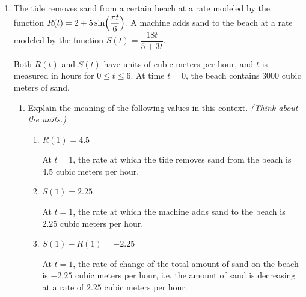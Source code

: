 \documentclass[main]{subfiles}
\begin{document}
\begin{enumerate}
\item The tide removes sand from a certain beach at 
a rate modeled by the function
$R(t)=2+5\sin\Bigl(\dfrac{\pi t}{6}\Bigr).$
A machine adds sand to the beach at a rate modeled by
the function
$S(t)=\dfrac{18t}{5+3t}.$

Both $R(t)$ and $S(t)$ have units of cubic meters per hour, and $t$
is measured in hours for $0 \leq t \leq 6$. At time $t=0$, the beach contains $3000$ cubic meters of sand. 
\begin{enumerate}
    \item Explain the meaning of the following values in this context.
    \emph{(Think about the units.)}

    \begin{enumerate}
        \item \begin{problem}[\vfill]
        $R(1)=4.5$
        \end{problem}

        \begin{solution}
            At $t=1$, the rate at
            which the tide removes sand from the beach is
            $4.5$ cubic meters per hour.
        \end{solution}
        
        \item \begin{problem}[\vfill]
        $S(1)=2.25$
        \end{problem}

        \begin{solution}
            At $t=1$, the rate at which the machine adds sand to the beach is $2.25$ cubic meters
            per hour.
        \end{solution}
        
        \item \begin{problem}[\vfill] 
        $S(1)-R(1)=-2.25$
        \end{problem}

        \begin{solution}
            At $t=1$, the rate of
            change of the total amount of sand on the beach is
            $-2.25$ cubic meters per hour, i.e. the amount of sand
            is decreasing at a rate of $2.25$ cubic meters per hour.
        \end{solution}

    \end{enumerate}


\end{enumerate}
\end{enumerate}
\end{document}
